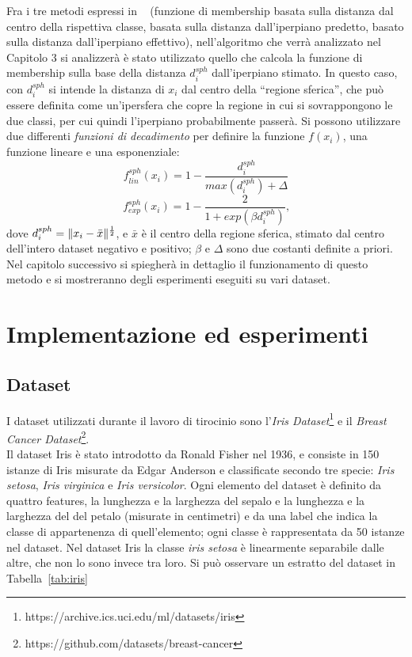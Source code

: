 \documentclass[oneside, openany]{book}
\DeclarePairedDelimiter{\norma}{\lVert}{\rVert}
\begin{document}
	Fra i tre metodi espressi in ~\cite{bib:cil} (funzione di membership basata sulla distanza dal centro della rispettiva classe, basata sulla distanza dall'iperpiano predetto, basato sulla distanza dall'iperpiano effettivo), nell'algoritmo che verrà analizzato nel Capitolo 3 si analizzerà è stato utilizzato quello che calcola la funzione di membership sulla base della distanza $d_i^{sph}$ dall'iperpiano stimato. In questo caso, con $d_i^{sph}$ si intende la distanza di $x_i$ dal centro della ``regione sferica'', che può essere definita come un'ipersfera che copre la regione in cui si sovrappongono le due classi, per cui quindi l'iperpiano probabilmente passerà. Si possono utilizzare due differenti \textit{funzioni di decadimento} per definire la funzione $f(x_i)$, una funzione lineare e una esponenziale:
	\[
		f_{lin}	^{sph}(x_i) = 1 - \frac{d_i^{sph}}{max(d_i^{sph})+\Delta} 
	\]
	\[
		f_{exp}	^{sph}(x_i) = 1 - \frac{2}{1+exp(\beta d_i^{sph})}\text{,}
	\]
	dove $d_i^{sph}=\norma{x_i-\bar{x}}^{\frac{1}{2}}$, e $\bar{x}$ è il centro della regione sferica, stimato dal centro dell'intero dataset negativo e positivo; $\beta$ e $\Delta$ sono due costanti definite a priori. Nel capitolo successivo si spiegherà in dettaglio il funzionamento di questo metodo e si mostreranno degli esperimenti eseguiti su vari dataset.	

	\chapter{Implementazione ed esperimenti}
	\section{Dataset}
	I dataset utilizzati durante il lavoro di tirocinio sono l'\textit{Iris Dataset}\footnote{https://archive.ics.uci.edu/ml/datasets/iris} e il \textit{Breast Cancer Dataset}\footnote{https://github.com/datasets/breast-cancer}.\\
	Il dataset Iris è stato introdotto da Ronald Fisher nel 1936, e consiste in 150 istanze di Iris misurate da Edgar Anderson e classificate secondo tre specie: \textit{Iris setosa}, \textit{Iris virginica} e \textit{Iris versicolor}. Ogni elemento del dataset è definito da quattro features, la lunghezza e la larghezza del sepalo e la lunghezza e la larghezza del del petalo (misurate in centimetri) e da una label che indica la classe di appartenenza di quell'elemento; ogni classe è rappresentata da 50 istanze nel dataset. Nel dataset Iris la classe \textit{iris setosa} è linearmente separabile dalle altre, che non lo sono invece tra loro. Si può osservare un estratto del dataset in Tabella~\ref{tab:iris}
	
\end{document}
